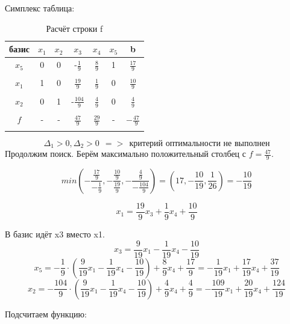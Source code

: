 \documentclass{article}
\begin{document}
Симплекс таблица:

\begin{table}[H]
    \centering
    \caption{Расчёт строки f}
    \begin{tabular}{|c|c|c|c|c|c|c|}
    \hline
        базис & $x_1$ & $x_2$ & $x_3$ & $x_4$ & $x_5$ & b \\ \hline
        $x_5$ & 0	&0&	-$\frac{1}{9}$	&$\frac{8}{9}$&	1	&$\frac{17}{9}$ \\
          &	&&	&&		&\\\hline
        $x_1$ & 1	&0&	$\frac{19}{9}$	&$\frac{1}{9}$	&0&	$\frac{10}{9}$ \\
        &	&&	&&		&\\\hline
        $x_2$  & 0&1	&-$\frac{104}{9}$	&$\frac{4}{9}$&0	&$\frac{4}{9}$ \\ 
        &	&&	&&		&\\\hline
        $f$  & -&-	&$\frac{47}{9}$	&$ \frac{29}{9}$&-	&$-\frac{47}{9}$ \\ 
        &	&&	&&		&\\\hline
    \end{tabular}
\end{table}
\[\Delta_1 > 0, \Delta_2 > 0\ \ => \ \ \text{критерий оптимальности не выполнен} \]
Продолжим поиск. Берём максимально положительный столбец с $f = \frac{47}{9}$. 

\[min\left(-\frac{\frac{17}{9}}{-\frac{1}{9}}, -\frac{\frac{10}{9}}{\frac{19}{9}}, -\frac{\frac{4}{9}}{-\frac{104}{9}}\right) = (17, -\frac{10}{19}, \frac{1}{26}) = -\frac{10}{19} \]


\[x_1 = \frac{19}{9}x_3 + \frac{1}{9}x_4 + \frac{10}{9}\]

В базис идёт x3 вместо x1.
\[x_3 = \frac{9}{19}x_1 -\frac{1}{19}x_4 - \frac{10}{19}\]
\[x_5 = -\frac{1}{9}\cdot(\frac{9}{19}x_1 -\frac{1}{19}x_4 - \frac{10}{19}) + \frac{8}{9}x_4 + \frac{17}{9} = 
-\frac{1}{19}x_1 + \frac{17}{19}x_4 + \frac{37}{19}\]
\[x_2 = -\frac{104}{9}\cdot(\frac{9}{19}x_1 -\frac{1}{19}x_4 - \frac{10}{19}) + \frac{4}{9}x_4+ \frac{4}{9} = 
-\frac{109}{19}x_1 + \frac{20}{19}x_4 + \frac{124}{19}\]

Подсчитаем функцию:
\end{document}
